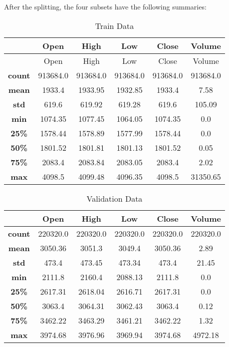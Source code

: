 After the splitting, the four subsets have the following summaries:

\begin{table}[H]
    \centering
    \begin{tabular}{cccccc}
        \toprule
        & Open & High & Low & Close & Volume
        \\
        \midrule
        & Open & High & Low & Close & Volume
        \\
        \textbf{count} & 913684.0 & 913684.0 & 913684.0 & 913684.0 & 913684.0 \\
        \textbf{mean}  & 1933.4   & 1933.95  & 1932.85  & 1933.4   & 7.58     \\
        \textbf{std}   & 619.6    & 619.92   & 619.28   & 619.6    & 105.09   \\
        \textbf{min}   & 1074.35  & 1077.45  & 1064.05  & 1074.35  & 0.0      \\
        \textbf{25\%}  & 1578.44  & 1578.89  & 1577.99  & 1578.44  & 0.0      \\
        \textbf{50\%}  & 1801.52  & 1801.81  & 1801.13  & 1801.52  & 0.05     \\
        \textbf{75\%}  & 2083.4   & 2083.84  & 2083.05  & 2083.4   & 2.02     \\
        \textbf{max}   & 4098.5   & 4099.48  & 4096.35  & 4098.5   & 31350.65 \\
        \bottomrule
    \end{tabular}
    \caption{Train Data}
    \label{tbl:train-data}
\end{table}

\begin{table}[H]
    \centering
    \begin{tabular}{cccccc}
        \toprule
        & Open & High & Low & Close & Volume
        \\
        \midrule
        \textbf{count} & 220320.0 & 220320.0 & 220320.0 & 220320.0 & 220320.0 \\
        \textbf{mean}  & 3050.36  & 3051.3   & 3049.4   & 3050.36  & 2.89     \\
        \textbf{std}   & 473.4    & 473.45   & 473.34   & 473.4    & 21.45    \\
        \textbf{min}   & 2111.8   & 2160.4   & 2088.13  & 2111.8   & 0.0      \\
        \textbf{25\%}  & 2617.31  & 2618.04  & 2616.71  & 2617.31  & 0.0      \\
        \textbf{50\%}  & 3063.4   & 3064.31  & 3062.43  & 3063.4   & 0.12     \\
        \textbf{75\%}  & 3462.22  & 3463.29  & 3461.21  & 3462.22  & 1.32     \\
        \textbf{max}   & 3974.68  & 3976.96  & 3969.94  & 3974.68  & 4972.18  \\
        \bottomrule
    \end{tabular}
    \caption{Validation Data}
    \label{tbl:validation-data}
\end{table}

